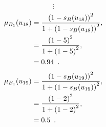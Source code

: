 \documentclass[a4paper,openany]{book}
\begin{document}
				\[
					\vdots
				\]
				\begin{align}
					\mu_{B_1}(u_{18}) &= \frac{\left(1-s_B(u_{18})\right)^2}{1 + \left(1-s_B(u_{18})\right)^2} ,\\
					&= \frac{\left(1-5\right)^2}{1 + \left(1-5\right)^2} \notag ,\\
					&= 0.94 \enspace. \notag
				\end{align}
				\begin{align}
					\mu_{B_1}(u_{19}) &= \frac{\left(1-s_B(u_{19})\right)^2}{1 + \left(1-s_B(u_{19})\right)^2} ,\\
					&= \frac{\left(1-2\right)^2}{1 + \left(1-2\right)^2} \notag ,\\
					&= 0.5 \enspace. \notag
				\end{align}
\end{document}
